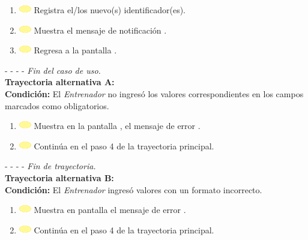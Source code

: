 \begin{enumerate}
	\item \includegraphics[width=15pt]{./Figuras/iconosCU/herramienta.png} Registra el/los nuevo(s) identificador(es).
	\item \includegraphics[width=15pt]{./Figuras/iconosCU/herramienta.png} Muestra el mensaje de notificación .
	\item \includegraphics[width=15pt]{./Figuras/iconosCU/herramienta.png} Regresa a la pantalla .	
\end{enumerate}
	
- - - - \textit{Fin del caso de uso.} \\

\textbf{\large{Trayectoria alternativa A:}}\\
\textbf{Condición: } El \textit{Entrenador} no ingresó los valores correspondientes en los campos marcados como obligatorios.

\begin{enumerate}
	\item \includegraphics[width=15pt]{./Figuras/iconosCU/herramienta.png} Muestra en la pantalla , el mensaje de error .
	\item \includegraphics[width=15pt]{./Figuras/iconosCU/herramienta.png} Continúa en el paso 4 de la trayectoria principal.
\end{enumerate}

- - - - \textit{Fin de trayectoria.} \\

\textbf{\large{Trayectoria alternativa B:}}\\
\textbf{Condición: } El \textit{Entrenador} ingresó valores con un formato incorrecto.

\begin{enumerate}
	\item \includegraphics[width=15pt]{./Figuras/iconosCU/herramienta.png} Muestra en pantalla el mensaje de error .
	\item \includegraphics[width=15pt]{./Figuras/iconosCU/herramienta.png} Continúa en el paso 4 de la trayectoria principal.
\end{enumerate}

